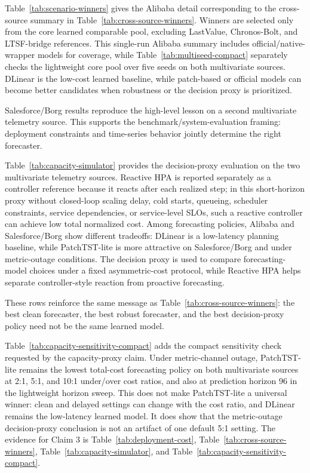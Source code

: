 \documentclass[conference]{IEEEtran}
\begin{document}


Table~\ref{tab:scenario-winners} gives the Alibaba detail corresponding to the cross-source summary in Table~\ref{tab:cross-source-winners}. Winners are selected only from the core learned comparable pool, excluding LastValue, Chronos-Bolt, and LTSF-bridge references. This single-run Alibaba summary includes official/native-wrapper models for coverage, while Table~\ref{tab:multiseed-compact} separately checks the lightweight core pool over five seeds on both multivariate sources. DLinear is the low-cost learned baseline, while patch-based or official models can become better candidates when robustness or the decision proxy is prioritized.

Salesforce/Borg results reproduce the high-level lesson on a second multivariate telemetry source. This supports the benchmark/system-evaluation framing: deployment constraints and time-series behavior jointly determine the right forecaster.



Table~\ref{tab:capacity-simulator} provides the decision-proxy evaluation on the two multivariate telemetry sources. Reactive HPA is reported separately as a controller reference because it reacts after each realized step; in this short-horizon proxy without closed-loop scaling delay, cold starts, queueing, scheduler constraints, service dependencies, or service-level SLOs, such a reactive controller can achieve low total normalized cost. Among forecasting policies, Alibaba and Salesforce/Borg show different tradeoffs: DLinear is a low-latency planning baseline, while PatchTST-lite is more attractive on Salesforce/Borg and under metric-outage conditions. The decision proxy is used to compare forecasting-model choices under a fixed asymmetric-cost protocol, while Reactive HPA helps separate controller-style reaction from proactive forecasting.

These rows reinforce the same message as Table~\ref{tab:cross-source-winners}: the best clean forecaster, the best robust forecaster, and the best decision-proxy policy need not be the same learned model.



Table~\ref{tab:capacity-sensitivity-compact} adds the compact sensitivity check requested by the capacity-proxy claim. Under metric-channel outage, PatchTST-lite remains the lowest total-cost forecasting policy on both multivariate sources at 2:1, 5:1, and 10:1 under/over cost ratios, and also at prediction horizon 96 in the lightweight horizon sweep. This does not make PatchTST-lite a universal winner: clean and delayed settings can change with the cost ratio, and DLinear remains the low-latency learned model. It does show that the metric-outage decision-proxy conclusion is not an artifact of one default 5:1 setting. The evidence for Claim 3 is Table~\ref{tab:deployment-cost}, Table~\ref{tab:cross-source-winners}, Table~\ref{tab:capacity-simulator}, and Table~\ref{tab:capacity-sensitivity-compact}.
\end{document}
